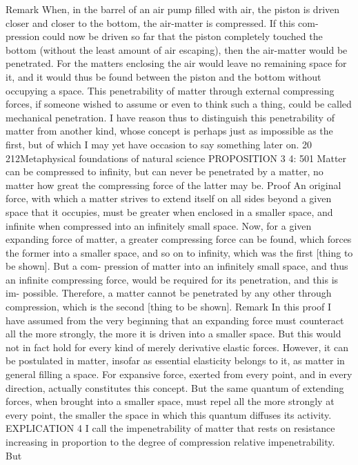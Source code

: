 Remark
When, in the barrel of an air pump ﬁlled with air, the piston is driven
closer and closer to the bottom, the air-matter is compressed. If this com-
pression could now be driven so far that the piston completely touched
the bottom (without the least amount of air escaping), then the air-matter
would be penetrated. For the matters enclosing the air would leave no
remaining space for it, and it would thus be found between the piston
and the bottom without occupying a space. This penetrability of matter
through external compressing forces, if someone wished to assume or
even to think such a thing, could be called mechanical penetration. I have
reason thus to distinguish this penetrability of matter from another kind,
whose concept is perhaps just as impossible as the ﬁrst, but of which I
may yet have occasion to say something later on. 20
212Metaphysical foundations of natural science
PROPOSITION 3
4: 501
Matter can be compressed to inﬁnity, but can never be penetrated by a
matter, no matter how great the compressing force of the latter may be.
Proof
An original force, with which a matter strives to extend itself on all sides
beyond a given space that it occupies, must be greater when enclosed
in a smaller space, and inﬁnite when compressed into an inﬁnitely small
space. Now, for a given expanding force of matter, a greater compressing
force can be found, which forces the former into a smaller space, and
so on to inﬁnity, which was the ﬁrst [thing to be shown]. But a com-
pression of matter into an inﬁnitely small space, and thus an inﬁnite
compressing force, would be required for its penetration, and this is im-
possible. Therefore, a matter cannot be penetrated by any other through
compression, which is the second [thing to be shown].
Remark
In this proof I have assumed from the very beginning that an expanding
force must counteract all the more strongly, the more it is driven into a
smaller space. But this would not in fact hold for every kind of merely
derivative elastic forces. However, it can be postulated in matter, insofar
as essential elasticity belongs to it, as matter in general ﬁlling a space. For
expansive force, exerted from every point, and in every direction, actually
constitutes this concept. But the same quantum of extending forces, when
brought into a smaller space, must repel all the more strongly at every
point, the smaller the space in which this quantum diffuses its activity.
EXPLICATION 4
I call the impenetrability of matter that rests on resistance increasing in
proportion to the degree of compression relative impenetrability. But
